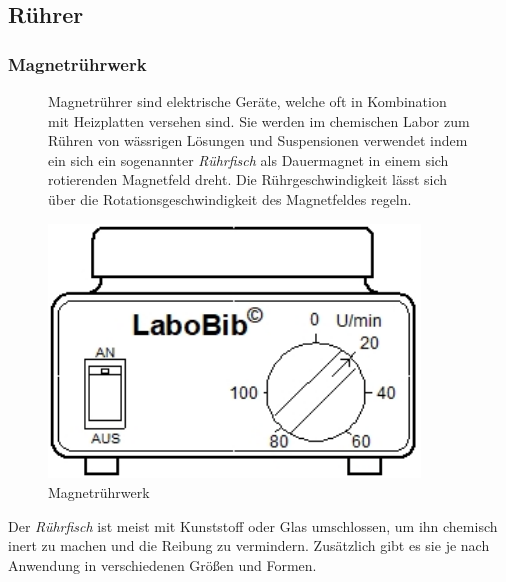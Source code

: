 \subsection{Rührer}
\subsubsection*{Magnetrührwerk}
\begin{figure}[h!]
	\begin{minipage}[t]{0.6\textwidth}
		\vspace{0pt}
		Magnetrührer sind elektrische Geräte, welche oft in Kombination mit Heizplatten versehen sind. Sie werden im chemischen Labor zum Rühren von wässrigen Lösungen und Suspensionen verwendet indem ein sich ein sogenannter \textit{Rührfisch} als Dauermagnet in einem sich rotierenden Magnetfeld dreht. Die Rührgeschwindigkeit lässt sich über die Rotationsgeschwindigkeit des Magnetfeldes regeln.
	\end{minipage}
	\hfill
	\hspace{1mm}
	\begin{minipage}[t]{0.35\textwidth}
		\vspace{0pt}
		\centering
		\includegraphics[width=0.88\textwidth]{img/magnetruehrer}
		\caption{Magnetrührwerk}
		\label{fig:magnetruehrwerk}
	\end{minipage}
\end{figure}
\FloatBarrier
	Der \textit{Rührfisch} ist meist mit Kunststoff oder Glas umschlossen, um ihn chemisch inert zu machen und die Reibung zu vermindern. Zusätzlich gibt es sie je nach Anwendung in verschiedenen Größen und Formen. 
	
